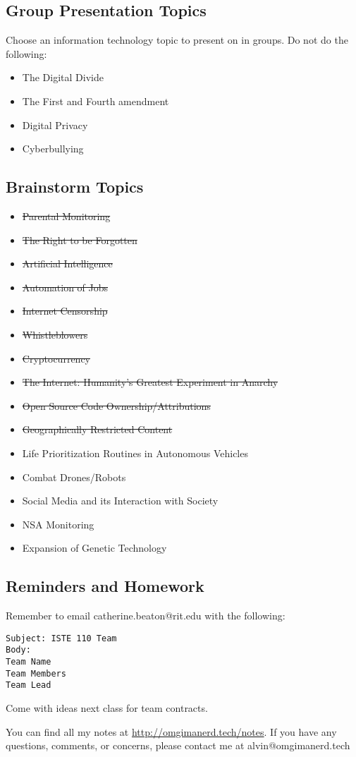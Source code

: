 \documentclass{article}
\begin{document}
\subsection*{Group Presentation Topics}
Choose an information technology topic to present on in groups. Do not do the
following:
\begin{itemize}
  \item The Digital Divide
  \item The First and Fourth amendment
  \item Digital Privacy
  \item Cyberbullying
\end{itemize}

\subsection*{Brainstorm Topics}
\begin{itemize}
  \item \sout{Parental Monitoring}
  \item \sout{The Right to be Forgotten}
  \item \sout{Artificial Intelligence}
  \item \sout{Automation of Jobs}
  \item \sout{Internet Censorship}
  \item \sout{Whistleblowers}
  \item \sout{Cryptocurrency}
  \item \sout{The Internet: Humanity's Greatest Experiment in Anarchy}
  \item \sout{Open Source Code Ownership/Attributions}
  \item \sout{Geographically Restricted Content}
  \item Life Prioritization Routines in Autonomous Vehicles
  \item Combat Drones/Robots
  \item Social Media and its Interaction with Society
  \item NSA Monitoring
  \item Expansion of Genetic Technology
\end{itemize}

\subsection*{Reminders and Homework}
Remember to email catherine.beaton@rit.edu with the following:
\begin{verbatim}
Subject: ISTE 110 Team
Body:
Team Name
Team Members
Team Lead
\end{verbatim}
Come with ideas next class for team contracts.

\begin{center}
  You can find all my notes at \url{http://omgimanerd.tech/notes}. If you have
  any questions, comments, or concerns, please contact me at
  alvin@omgimanerd.tech
\end{center}
\end{document}
